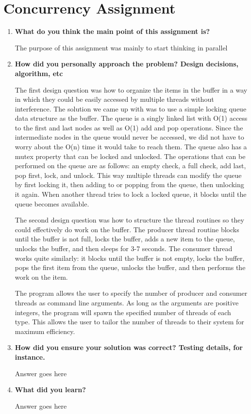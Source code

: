\documentclass[letterpaper,10pt,titlepage,draftclsnofoot,onecolumn]{IEEEtran}
\begin{document}
\section{Concurrency Assignment}
\begin{enumerate}
\item \textbf{What do you think the main point of this assignment is?}

The purpose of this assignment was mainly to start thinking in parallel \par

\item \textbf{How did you personally approach the problem? Design decisions, algorithm, etc}

  The first design question was how to organize the items in the buffer in a way in which they could be easily accessed by multiple threads without interference. The solution we came up with was to use a simple locking queue data structure as the buffer. The queue is a singly linked list with O(1) access to the first and last nodes as well as O(1) add and pop operations. Since the intermediate nodes in the queue would never be accessed, we did not have to worry about the O(n) time it would take to reach them. The queue also has a mutex property that can be locked and unlocked. The operations that can be performed on the queue are as follows: an empty check, a full check, add last, pop first, lock, and unlock. This way multiple threads can modify the queue by first locking it, then adding to or popping from the queue, then unlocking it again. When another thread tries to lock a locked queue, it blocks until the queue becomes available. \par
  The second design question was how to structure the thread routines so they could effectively do work on the buffer. The producer thread routine blocks until the buffer is not full, locks the buffer, adds a new item to the queue, unlocks the buffer, and then sleeps for 3-7 seconds. The consumer thread works quite similarly: it blocks until the buffer is not empty, locks the buffer, pops the first item from the queue, unlocks the buffer, and then performs the work on the item. \par
  The program allows the user to specify the number of producer and consumer threads as command line arguments. As long as the arguments are positive integers, the program will spawn the specified number of threads of each type. This allows the user to tailor the number of threads to their system for maximum efficiency. \par

\item \textbf{How did you ensure your solution was correct? Testing details, for instance.}

Answer goes here \par

\item \textbf{What did you learn?}

Answer goes here \par

\end{enumerate}
\end{document}
